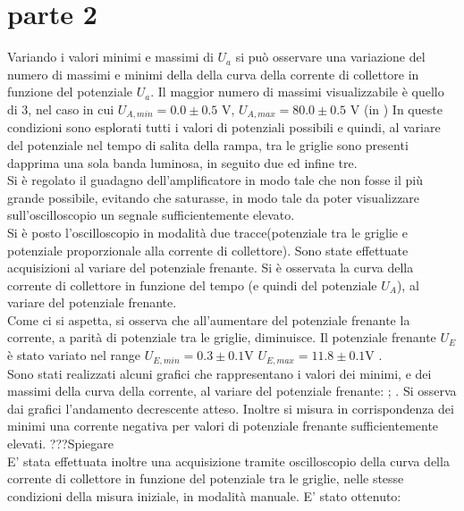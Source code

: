 \section{parte 2}
Variando i valori minimi e massimi di $U_{a}$ si può osservare una variazione del numero di massimi e minimi della della curva della corrente di collettore in funzione del potenziale $U_{a}$. Il maggior numero di massimi visualizzabile è quello di 3, nel caso in cui $U_{A,min}= 0.0 \pm 0.5$ V, $U_{A,max}= 80.0 \pm 0.5$ V (in ) 
In queste condizioni sono esplorati tutti i valori di potenziali possibili e quindi, al variare del potenziale nel tempo di salita della rampa, tra le griglie sono presenti dapprima una sola banda luminosa, in seguito due ed infine tre.\\
Si è regolato il guadagno dell'amplificatore in modo tale che non fosse il più grande possibile, evitando che saturasse, in modo tale da poter visualizzare sull'oscilloscopio un segnale sufficientemente elevato.\\
Si è posto l'oscilloscopio in modalità due tracce(potenziale tra le griglie e potenziale proporzionale alla corrente di collettore). Sono state effettuate acquisizioni al variare del potenziale frenante.
Si è osservata la curva della corrente di collettore in funzione del tempo (e quindi del potenziale $U_{A}$), al variare del potenziale frenante.\\
Come ci si aspetta, si osserva che all'aumentare del potenziale frenante la corrente, a parità di potenziale tra le griglie, diminuisce. Il potenziale frenante $U_{E}$ è stato variato nel range $U_{E,min}=0.3\pm 0.1$V  $U_{E,max}=11.8 \pm 0.1$V . \\ 
Sono stati realizzati alcuni grafici che rappresentano i valori dei minimi, e dei massimi della curva della corrente, al variare del potenziale frenante: ; .
Si osserva dai grafici l'andamento decrescente atteso. Inoltre si misura in corrispondenza dei minimi una corrente negativa per valori di potenziale frenante sufficientemente elevati. ???Spiegare \\
E' stata effettuata inoltre una acquisizione tramite oscilloscopio della curva della corrente di collettore in funzione del potenziale tra le griglie, nelle stesse condizioni della misura iniziale, in modalità manuale. E' stato ottenuto:
